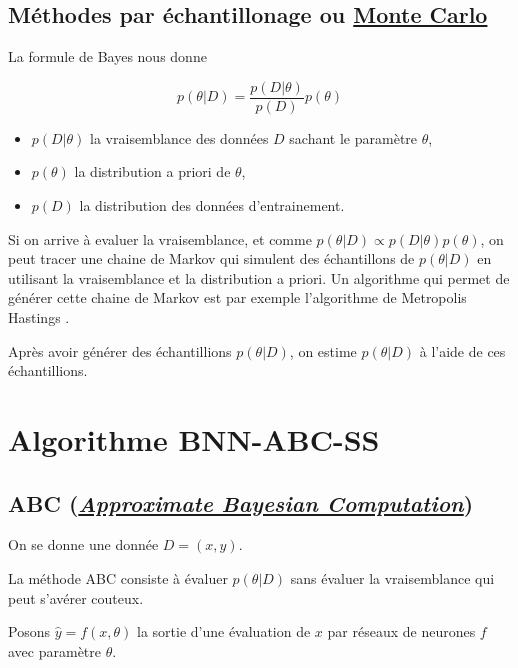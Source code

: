 \documentclass[french,12pt]{article}
\let\oldsection\section%
\renewcommand{\section}{%
  \renewcommand{\theequation}{\thesection.\arabic{equation}}%
  \oldsection}%
\let\oldsubsection\subsection%
\renewcommand{\subsection}{%
  \renewcommand{\theequation}{\thesubsection.\arabic{equation}}%
  \oldsubsection}%
\begin{document}
\subsection{Méthodes par échantillonage ou \href{https://en.wikipedia.org/wiki/Monte_Carlo_method}{Monte Carlo}}

La formule de Bayes nous donne

$$p(\theta | D) = \frac{p(D | \theta) }{p(D)}p(\theta)$$

\begin{itemize}
    \item $p(D | \theta)$ la vraisemblance des données $D$ sachant le paramètre $\theta$,
    \item $p(\theta)$ la distribution a priori de $\theta$,
    \item $p(D)$ la distribution des données d'entrainement.
\end{itemize}


Si on arrive à evaluer la vraisemblance, et comme $p(\theta | D) \propto p(D | \theta) p(\theta)$, 
on peut tracer une chaine de Markov qui simulent des échantillons de $p(\theta | D)$ en utilisant
la vraisemblance et la distribution a priori. Un algorithme qui permet de générer
cette chaine de Markov est par exemple l'algorithme de Metropolis Hastings \cite{Uncertainty_Deep}.

Après avoir générer des échantillions $p(\theta | D)$, on estime $p(\theta | D)$ à l'aide de ces 
échantillions.





\pagebreak

\section{Algorithme BNN-ABC-SS}

\subsection{ABC (\href{https://en.wikipedia.org/wiki/Approximate_Bayesian_computation}{\textit{Approximate Bayesian Computation}})}

On se donne une donnée $D = (x, y)$.

La méthode ABC consiste à évaluer $p(\theta | D)$ sans évaluer
la vraisemblance qui peut s'avérer couteux.

Posons $\hat{y} = f(x, \theta)$ la sortie d'une évaluation de $x$ par
réseaux de neurones $f$ avec paramètre $\theta$.
\end{document}
